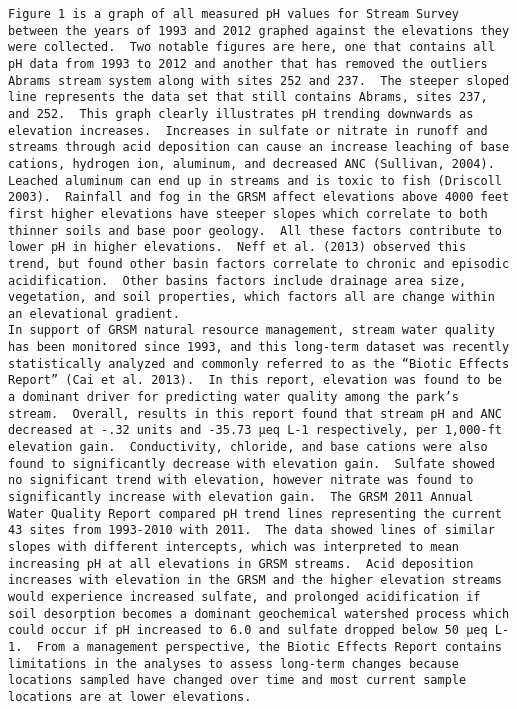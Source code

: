 \begin{verbatim}
Figure 1 is a graph of all measured pH values for Stream Survey between the years of 1993 and 2012 graphed against the elevations they were collected.  Two notable figures are here, one that contains all pH data from 1993 to 2012 and another that has removed the outliers Abrams stream system along with sites 252 and 237.  The steeper sloped line represents the data set that still contains Abrams, sites 237, and 252.  This graph clearly illustrates pH trending downwards as elevation increases.  Increases in sulfate or nitrate in runoff and streams through acid deposition can cause an increase leaching of base cations, hydrogen ion, aluminum, and decreased ANC (Sullivan, 2004).  Leached aluminum can end up in streams and is toxic to fish (Driscoll 2003).  Rainfall and fog in the GRSM affect elevations above 4000 feet first higher elevations have steeper slopes which correlate to both thinner soils and base poor geology.  All these factors contribute to lower pH in higher elevations.  Neff et al. (2013) observed this trend, but found other basin factors correlate to chronic and episodic acidification.  Other basins factors include drainage area size, vegetation, and soil properties, which factors all are change within an elevational gradient.  
In support of GRSM natural resource management, stream water quality has been monitored since 1993, and this long-term dataset was recently statistically analyzed and commonly referred to as the “Biotic Effects Report” (Cai et al. 2013).  In this report, elevation was found to be a dominant driver for predicting water quality among the park’s stream.  Overall, results in this report found that stream pH and ANC decreased at -.32 units and -35.73 μeq L-1 respectively, per 1,000-ft elevation gain.  Conductivity, chloride, and base cations were also found to significantly decrease with elevation gain.  Sulfate showed no significant trend with elevation, however nitrate was found to significantly increase with elevation gain.  The GRSM 2011 Annual Water Quality Report compared pH trend lines representing the current 43 sites from 1993-2010 with 2011.  The data showed lines of similar slopes with different intercepts, which was interpreted to mean increasing pH at all elevations in GRSM streams.  Acid deposition increases with elevation in the GRSM and the higher elevation streams would experience increased sulfate, and prolonged acidification if soil desorption becomes a dominant geochemical watershed process which could occur if pH increased to 6.0 and sulfate dropped below 50 μeq L-1.  From a management perspective, the Biotic Effects Report contains limitations in the analyses to assess long-term changes because locations sampled have changed over time and most current sample locations are at lower elevations.


\end{verbatim}
